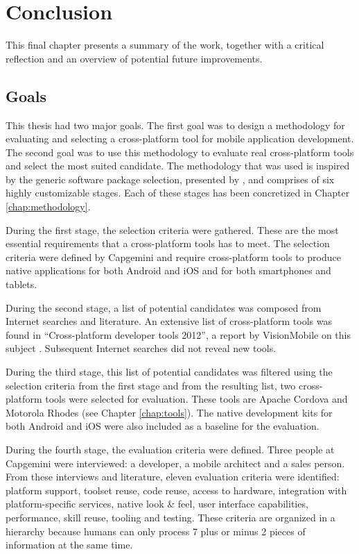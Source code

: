 \chapter{Conclusion}
\label{chap:conclusion}

This final chapter presents a summary of the work, together with a critical reflection and an overview of potential future improvements. 

\section{Goals}
\label{sec:goals}

This thesis had two major goals. The first goal was to design a methodology for evaluating and selecting a cross-platform tool for mobile application development. The second goal was to use this methodology to evaluate real cross-platform tools and select the most suited candidate. The methodology that was used is inspired by the generic software package selection, presented by \citet{Jadhav:2011}, and comprises of six highly customizable stages. Each of these stages has been concretized in Chapter \ref{chap:methodology}. 

During the first stage, the selection criteria were gathered. These are the most essential requirements that a cross-platform tools has to meet. The selection criteria were defined by Capgemini and require cross-platform tools to produce native applications for both Android and iOS and for both smartphones and tablets. 

During the second stage, a list of potential candidates was composed from Internet searches and literature. An extensive list of cross-platform tools was found in ``Cross-platform developer tools 2012'', a report by VisionMobile on this subject \cite{VMCPT:2012}. Subsequent Internet searches did not reveal new tools.

During the third stage, this list of potential candidates was filtered using the selection criteria from the first stage and from the resulting list, two cross-platform tools were selected for evaluation. These tools are Apache Cordova and Motorola Rhodes (see Chapter \ref{chap:tools}). The native development kits for both Android and iOS were also included as a baseline for the evaluation. 

During the fourth stage, the evaluation criteria were defined. Three people at Capgemini were interviewed: a developer, a mobile architect and a sales person. From these interviews and literature, eleven evaluation criteria were identified: platform support, toolset reuse, code reuse, access to hardware, integration with platform-specific services, native look \& feel, user interface capabilities, performance, skill reuse, tooling and testing. These criteria are organized in a hierarchy because humans can only process 7 plus or minus 2 pieces of information at the same time.


